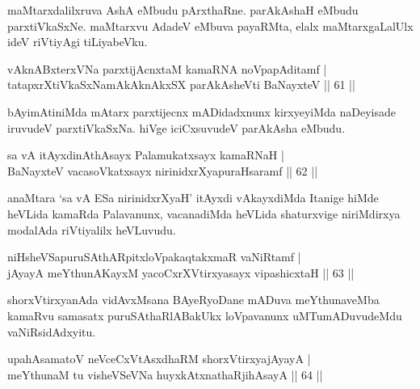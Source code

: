 \begin{artha}
maMtarxdalilxruva AshA eMbudu pArxthaRne. parAkAshaH eMbudu parxtiVkaSxNe. maMtarxvu AdadeV eMbuva payaRMta, elalx maMtarxgaLalUlx ideV riVtiyAgi tiLiyabeVku.
\end{artha}


\begin{shl}
vAknABxterxVNa parxtijAcnxtaM kamaRNA noVpapAditamf | \\
tatapxrXtiVkaSxNamAkAknAkxSX parAkAsheVti BaNayxteV \hfill|| 61 || 
\end{shl}

\begin{artha}
bAyimAtiniMda mAtarx parxtijecnx mADidadxnunx kirxyeyiMda naDeyisade 
iruvudeV parxtiVkaSxNa. hiVge iciCxsuvudeV parAkAsha eMbudu.
\end{artha}


\begin{shl}
sa vA itAyxdinA\s thAsayx Palamukatxsayx kamaRNaH | \\
BaNayxteV vacasoVkatxsayx nirinidxrXyapuraHsaramf \hfill|| 62 || 
\end{shl}

\begin{artha}
anaMtara `sa vA ESa nirinidxrXyaH' itAyxdi vAkayxdiMda Itanige hiMde 
heVLida kamaRda Palavanunx, vacanadiMda heVLida shaturxvige 
niriMdirxya modalAda riVtiyalilx heVLuvudu.
\end{artha}


\begin{shl}
niHsheVSapuruSAthARpitxloVpakaqtakxmaR vaNiRtamf | \\
jAyayA meYthunAKayxM yacoCxrXVtirxyasayx vipashicxtaH \hfill|| 63 || 
\end{shl}

\begin{artha}
shorxVtirxyanAda vidAvxMsana BAyeRyoDane mADuva meYthunaveMba kamaRvu samasatx puruSAthaRlABakUkx loVpavanunx uMTumADuvudeMdu vaNiRsidAdxyitu.
\end{artha}

\begin{shl}
upahAsamatoV neVceCxVtAsxdhaRM shorxVtirxyajAyayA | \\
meYthunaM tu visheVSeVNa huyxkAtxnathaRjihAsayA \hfill|| 64 || 
\end{shl}


